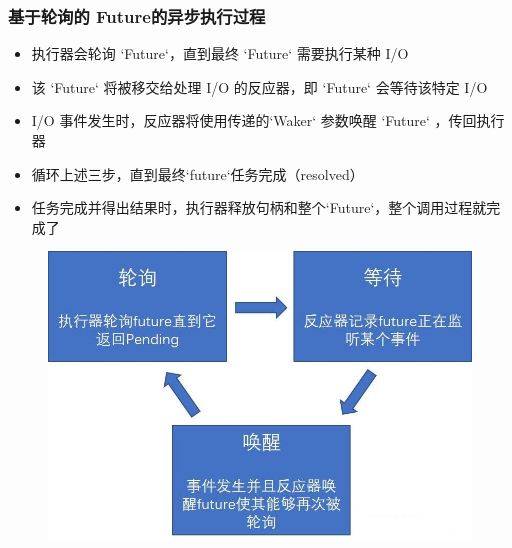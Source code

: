 \begin{frame}[fragile]
    \frametitle{基于轮询的 Future的异步执行过程}
% 
    \begin{itemize}
        \item 执行器会轮询 `Future`，直到最终 `Future` 需要执行某种 I/O 
        \item 该 `Future` 将被移交给处理 I/O 的反应器，即 `Future` 会等待该特定 I/O 
        \item I/O 事件发生时，反应器将使用传递的`Waker` 参数唤醒 `Future` ，传回执行器
        \item 循环上述三步，直到最终`future`任务完成（resolved）
        \item 任务完成并得出结果时，执行器释放句柄和整个`Future`，整个调用过程就完成了
    \end{itemize}
% 
    \begin{figure}
    \includegraphics[width=0.8\linewidth]{figs/future-loop.jpg}
    \end{figure}
% 
\end{frame}
